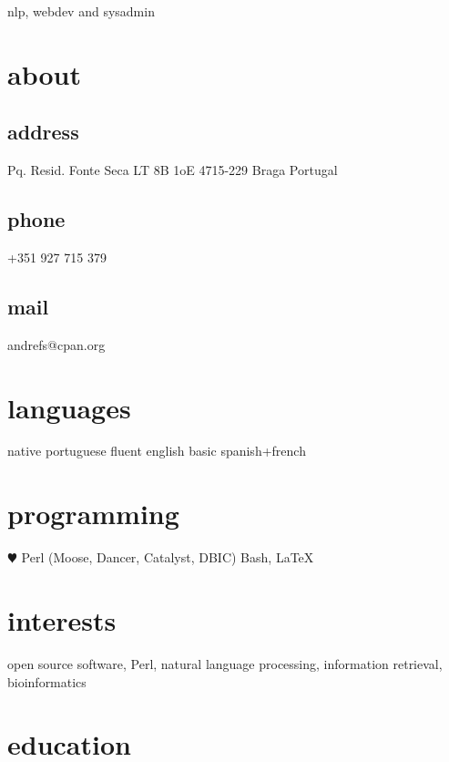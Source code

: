 \documentclass[a4paper]{friggeri-cv}
\begin{document}
       {nlp, webdev and sysadmin}


\begin{aside}
  \section{about}
  	\subsection{address}
  	Pq. Resid. Fonte Seca
	LT 8B 1oE
	4715-229 Braga
	Portugal
  	\subsection{phone}
	+351 927 715 379
  	\subsection{mail}
	andrefs@cpan.org
  \section{languages}
  	native portuguese
	fluent english
    basic spanish+french
  \section{programming}
    {$\varheartsuit$} Perl (Moose, Dancer, Catalyst, DBIC)
	Bash, \LaTeX
\end{aside}

\section{interests}

open source software, Perl, natural language processing, information retrieval,
bioinformatics

\section{education}
\end{document}
